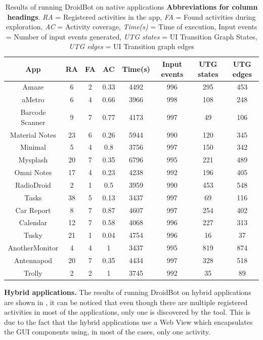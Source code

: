 \begin{table}[t]
	\centering
	\caption{Results of running DroidBot  on native applications  \textbf{Abbreviations for column headings}. \textit{RA} = Registered activities in the app, \textit{FA} = Found activities during exploration, \textit{AC} = Activity coverage, \textit{Time(s)} = Time of execution, Input events = Number of input events generated, \textit{UTG states} = UI Transition Graph States, \textit{UTG edges} = UI Transition graph edges}
	\label{DroidNative}
	\begin{adjustbox}{width=\textwidth}
		\begin{tabular}{|c|c|c|c|c|c|c|c|}
			\hline
			\textbf{App} & \textbf{RA} & \textbf{FA} & \textbf{AC} & \textbf{Time(s)} & \textbf{Input events} & \textbf{UTG states} & \textbf{UTG edges} \\\hline
			Amaze & 6 & 2 & 0.33 & 4492 & 996 & 295 & 453 \\\hline
			aMetro & 6 & 4 & 0.66 & 3966 & 998 & 108 & 248 \\\hline
			Barcode Scanner & 9 & 7 & 0.77 & 4173 & 997 & 49 & 106 \\\hline
			Material Notes & 23 & 6 & 0.26 & 5944 & 990 & 120 & 345 \\\hline
			Minimal & 5 & 4 & 0.8 & 3756 & 997 & 150 & 342 \\\hline
			Mysplash & 20 & 7 & 0.35 & 6796 & 995 & 221 & 489 \\\hline
			Omni Notes & 17 & 4 & 0.23 & 4238 & 992 & 196 & 405\\\hline
			RadioDroid & 2 & 1 & 0.5 & 3959 & 990 & 453 & 548\\\hline
			Tasks & 38 & 5 & 0.13 & 3437 & 997 & 69 & 116\\\hline
			Car Report & 8 & 7 & 0.87 & 4607 & 997 & 254 & 402 \\\hline
			Calendar & 12 & 7 & 0.58 & 4068 & 996 & 227 & 313\\\hline
			Tusky & 21 & 1 & 0.04 & 4754 & 996 & 16 & 37 \\\hline
			AnotherMonitor & 4 & 4 & 1 & 3437 & 995 & 819 & 874\\\hline
			Antennapod & 20 & 7 & 0.35 & 4434 & 997 & 328 & 518\\\hline
			Trolly & 2 & 2 & 1 & 3745 & 992 & 35 & 89 \\\hline
		\end{tabular}
	\end{adjustbox}
\end{table}

\textbf{Hybrid applications.} The results of running DroidBot on hybrid applications are shown in , it can be noticed that even though there are multiple registered activities in most of the applications, only one is discovered by the tool. This is due to the fact that the hybrid applications use a Web View which encapsulates the GUI components using, in most of the cases, only one activity.

